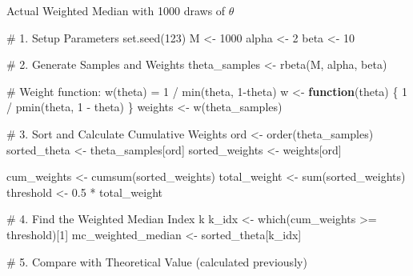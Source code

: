 \documentclass[
  letterpaper,
  DIV=11,
  numbers=noendperiod]{scrreprt}
\newenvironment{Shaded}{\begin{snugshade}}{\end{snugshade}}
\newcommand{\CommentTok}[1]{\textcolor[rgb]{0.37,0.37,0.37}{#1}}
\newcommand{\ControlFlowTok}[1]{\textcolor[rgb]{0.00,0.23,0.31}{\textbf{#1}}}
\newcommand{\DecValTok}[1]{\textcolor[rgb]{0.68,0.00,0.00}{#1}}
\newcommand{\FloatTok}[1]{\textcolor[rgb]{0.68,0.00,0.00}{#1}}
\newcommand{\FunctionTok}[1]{\textcolor[rgb]{0.28,0.35,0.67}{#1}}
\newcommand{\NormalTok}[1]{\textcolor[rgb]{0.00,0.23,0.31}{#1}}
\newcommand{\OtherTok}[1]{\textcolor[rgb]{0.00,0.23,0.31}{#1}}
\newcommand{\SpecialCharTok}[1]{\textcolor[rgb]{0.37,0.37,0.37}{#1}}
\renewcommand{\[}{\begin{equation}}
\renewcommand{\]}{\end{equation}}
\theoremstyle{definition}
\theoremstyle{plain}
\theoremstyle{plain}
\theoremstyle{plain}
\theoremstyle{definition}
\theoremstyle{plain}
\theoremstyle{remark}
\begin{document}
Actual Weighted Median with 1000 draws of \(\theta\)

\begin{Shaded}
\begin{Highlighting}[]
\CommentTok{\# 1. Setup Parameters}
\FunctionTok{set.seed}\NormalTok{(}\DecValTok{123}\NormalTok{)}
\NormalTok{M }\OtherTok{\textless{}{-}} \DecValTok{1000}
\NormalTok{alpha }\OtherTok{\textless{}{-}} \DecValTok{2}
\NormalTok{beta }\OtherTok{\textless{}{-}} \DecValTok{10}

\CommentTok{\# 2. Generate Samples and Weights}
\NormalTok{theta\_samples }\OtherTok{\textless{}{-}} \FunctionTok{rbeta}\NormalTok{(M, alpha, beta)}

\CommentTok{\# Weight function: w(theta) = 1 / min(theta, 1{-}theta)}
\NormalTok{w }\OtherTok{\textless{}{-}} \ControlFlowTok{function}\NormalTok{(theta) \{ }\DecValTok{1} \SpecialCharTok{/} \FunctionTok{pmin}\NormalTok{(theta, }\DecValTok{1} \SpecialCharTok{{-}}\NormalTok{ theta) \}}
\NormalTok{weights }\OtherTok{\textless{}{-}} \FunctionTok{w}\NormalTok{(theta\_samples)}

\CommentTok{\# 3. Sort and Calculate Cumulative Weights}
\NormalTok{ord }\OtherTok{\textless{}{-}} \FunctionTok{order}\NormalTok{(theta\_samples)}
\NormalTok{sorted\_theta }\OtherTok{\textless{}{-}}\NormalTok{ theta\_samples[ord]}
\NormalTok{sorted\_weights }\OtherTok{\textless{}{-}}\NormalTok{ weights[ord]}

\NormalTok{cum\_weights }\OtherTok{\textless{}{-}} \FunctionTok{cumsum}\NormalTok{(sorted\_weights)}
\NormalTok{total\_weight }\OtherTok{\textless{}{-}} \FunctionTok{sum}\NormalTok{(sorted\_weights)}
\NormalTok{threshold }\OtherTok{\textless{}{-}} \FloatTok{0.5} \SpecialCharTok{*}\NormalTok{ total\_weight}

\CommentTok{\# 4. Find the Weighted Median Index k}
\NormalTok{k\_idx }\OtherTok{\textless{}{-}} \FunctionTok{which}\NormalTok{(cum\_weights }\SpecialCharTok{\textgreater{}=}\NormalTok{ threshold)[}\DecValTok{1}\NormalTok{]}
\NormalTok{mc\_weighted\_median }\OtherTok{\textless{}{-}}\NormalTok{ sorted\_theta[k\_idx]}

\CommentTok{\# 5. Compare with Theoretical Value (calculated previously)}


\end{Highlighting}
\end{Shaded}
\end{document}
